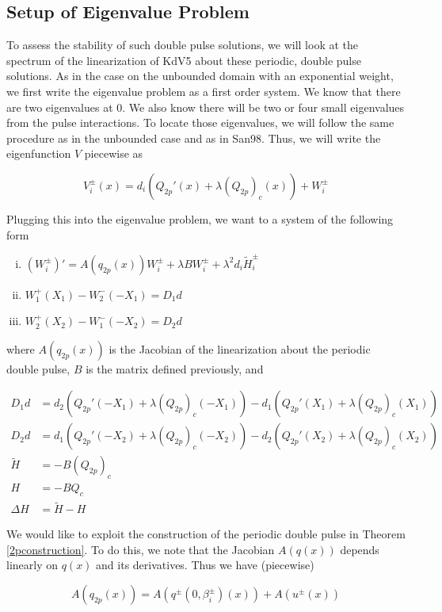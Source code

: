 \documentclass[12pt]{article}
\begin{document}
\subsection{Setup of Eigenvalue Problem}

To assess the stability of such double pulse solutions, we will look at the spectrum of the linearization of KdV5 about these periodic, double pulse solutions. As in the case on the unbounded domain with an exponential weight, we first write the eigenvalue problem as a first order system. We know that there are two eigenvalues at 0. We also know there will be two or four small eigenvalues from the pulse interactions. To locate those eigenvalues, we will follow the same procedure as in the unbounded case and as in San98. Thus, we will write the eigenfunction $V$ piecewise as

\[
V_i^\pm(x) = d_i (Q_{2p}'(x) + \lambda (Q_{2p})_c(x)) + W_i^\pm 
\]

Plugging this into the eigenvalue problem, we want to a system of the following form

\begin{enumerate}[(i)]
\item $(W_i^\pm)' = A(q_{2p}(x)) W_i^\pm + \lambda B W_i^\pm + \lambda^2 d_i \tilde{H}_i^\pm$
\item $W_1^+(X_1) - W_2^-(-X_1) = D_1 d$
\item $W_2^+(X_2) - W_1^-(-X_2) = D_2 d$
\end{enumerate}

where $A(q_{2p}(x))$ is the Jacobian of the linearization about the periodic double pulse, $B$ is the matrix defined previously, and 

\begin{align*}
D_1 d &= d_2(Q_{2p}'(-X_1) + \lambda (Q_{2p})_c(-X_1))
- d_1 ( Q_{2p}'(X_1) + \lambda (Q_{2p})_c(X_1) ) \\
D_2 d &= d_1(Q_{2p}'(-X_2) + \lambda (Q_{2p})_c(-X_2))
- d_2 ( Q_{2p}'(X_2) + \lambda (Q_{2p})_c(X_2) ) \\
\tilde{H} &= -B(Q_{2p})_c \\
H &= -B Q_c \\
\Delta H &= \tilde{H} - H
\end{align*}

We would like to exploit the construction of the periodic double pulse in Theorem \ref{2pconstruction}. To do this, we note that the Jacobian $A(q(x))$ depends linearly on $q(x)$ and its derivatives. Thus we have (piecewise)

\begin{equation}
A(q_{2p}(x)) = A(q^\pm(0, \beta_i^\pm)(x)) + A(u^\pm(x)) 
\end{equation}
\end{document}
